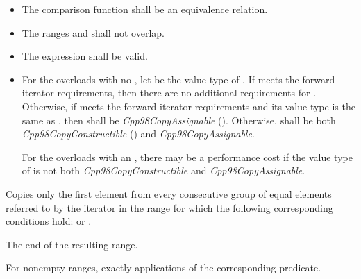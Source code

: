\begin{itemdescr}
\pnum
\requires
\begin{itemize}
\item
The comparison function shall be an equivalence relation.

\item
The ranges
and
shall not overlap.

\item
The expression
shall be valid.

\item
For the overloads with no ,
let  be the value type of .
If  meets the forward iterator requirements,
then there are no additional requirements for .
Otherwise, if  meets the forward iterator
requirements and its value type is the same as ,
then  shall be \textit{Cpp98CopyAssignable} ().
Otherwise,  shall be both
\textit{Cpp98CopyConstructible} () and \textit{Cpp98CopyAssignable}.
\begin{note}
For the overloads with an , there may be a performance
cost if the value type of  is not both
\textit{Cpp98CopyConstructible} and \textit{Cpp98CopyAssignable}.
\end{note}
\end{itemize}

\pnum
\effects
Copies only the first element from every consecutive group of equal elements referred to by
the iterator
in the range
for which the following corresponding conditions hold:
or
.

\pnum
\returns
The end of the resulting range.

\pnum
\complexity
For nonempty ranges, exactly
applications of the corresponding predicate.
\end{itemdescr}


